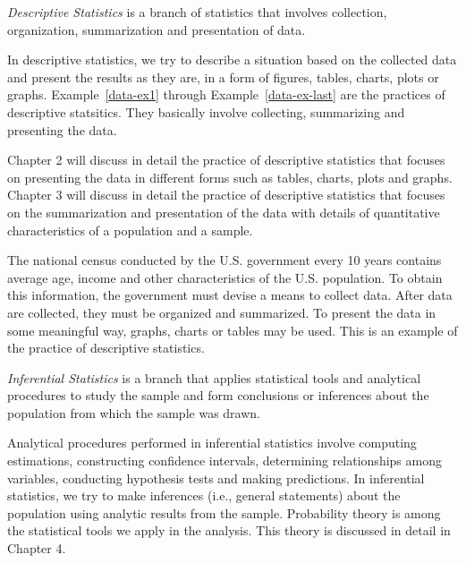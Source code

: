 \begin{definition} 
{\it{Descriptive Statistics}} is a branch of statistics that involves collection, organization, summarization and presentation of data.
\end{definition}

In descriptive statistics, we try to describe a situation based on the collected data and present the results as they are, in a form of figures, tables, charts, plots or graphs. Example~\ref{data-ex1} through Example~\ref{data-ex-last} are the practices of descriptive statsitics. They basically involve collecting, summarizing and presenting the data. 

Chapter 2 will discuss in detail the practice of descriptive statistics that focuses on presenting the data in different forms such as tables, charts, plots and graphs. Chapter 3 will discuss in detail the practice of descriptive statistics that focuses on the summarization and presentation of the data with details of quantitative characteristics of a population and a sample.

\begin{example}   
The national census conducted by the U.S. government every 10 years contains average age, income and other characteristics of the U.S. population. To obtain this information, the government must devise a means to collect data. After data are collected, they must be organized and summarized. To present the data in some meaningful way, graphs, charts or tables may be used. This is an example of the practice of descriptive statistics. 
\end{example} 

\begin{definition}  

{\it{Inferential Statistics}} is a branch that applies statistical tools and analytical procedures to study the sample and form conclusions or inferences about the population from which the sample was drawn. 
\end{definition} 
 
Analytical procedures performed in inferential statistics involve computing estimations, constructing confidence intervals, determining relationships among variables, conducting hypothesis tests and making predictions. In inferential statistics, we try to make inferences (i.e., general statements) about the population using analytic results from the sample. Probability theory is among the statistical tools we apply in the analysis. This theory is discussed in detail in Chapter 4. 


